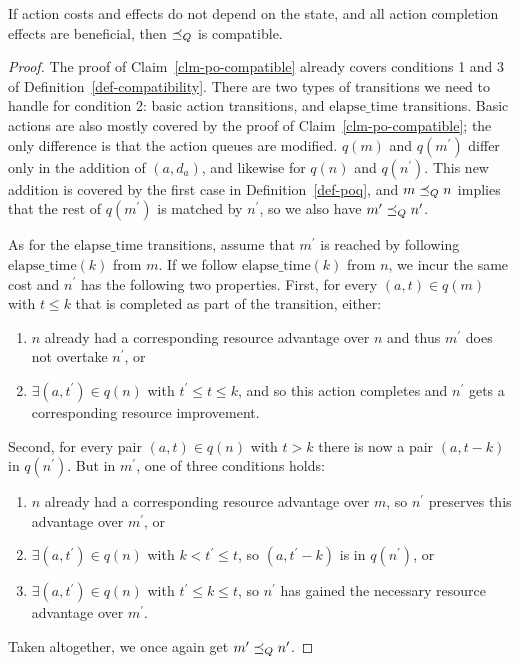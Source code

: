 \documentclass[letterpaper]{article}
\theoremstyle{plain} \newtheorem{theorem}{Theorem} \newtheorem{proposition}{Proposition} \newtheorem{lemma}{Lemma}
\theoremstyle{definition} \newtheorem{definition}{Definition} \newtheorem{conjecture}{Conjecture} \newtheorem*{example}{Example}
\theoremstyle{remark} \newtheorem*{remark}{Remark} \newtheorem*{note}{Note} \newtheorem{case}{Case}
\begin{document}
\begin{claim}{}{\label{clm-poq-compatible}}
	If action costs and effects do not depend on the state, and all action completion effects are beneficial, then $\preceq_Q$ is compatible.
\end{claim}
\begin{proof}

	The proof of Claim~\ref{clm-po-compatible} already covers conditions 1 and 3 of
Definition~\ref{def-compatibility}. There are two types of transitions we need to handle
for condition 2: basic action transitions, and $\mathrm{elapse\_time}$ transitions. Basic
actions are also mostly covered by the proof of Claim~\ref{clm-po-compatible}; the only
difference is that the action queues are modified. $q(m)$ and $q(m^\prime)$ differ only in
the addition of $(a, d_a)$, and likewise for $q(n)$ and $q(n^\prime)$. This new addition is
covered by the first case in Definition~\ref{def-poq}, and $m \preceq_Q n$ implies that the rest
of $q(m^\prime)$ is matched by $n^\prime$, so we also have $m^\prime \preceq_Q n^\prime$.

	As for the $\mathrm{elapse\_time}$ transitions, assume that $m^\prime$ is
reached by following $\mathrm{elapse\_time}(k)$ from $m$. If we follow $\mathrm{elapse\_time}(k)$ from $n$, we incur the same cost and $n^\prime$ has the following two properties. First, for every $(a, t) \in q(m)$ with $t \le k$ that is completed as part of the transition, either:
\begin{enumerate}
	\item $n$ already had a corresponding resource advantage over $n$ and thus $m^\prime$ does not overtake $n^\prime$, or
	\item $\exists (a, t^\prime) \in q(n)$ with $t^\prime \le t \le k$, and so this action completes and $n^\prime$ gets a corresponding resource improvement.
\end{enumerate}
Second, for every pair $(a, t) \in q(n)$ with $t > k$ there is now a pair $(a, t-k)$ in $q(n^\prime)$. But in $m^\prime$, one of three conditions holds:
\begin{enumerate}
	\item $n$ already had a corresponding resource advantage over $m$, so $n^\prime$ preserves this advantage over $m^\prime$, or
	\item $\exists (a, t^\prime) \in q(n)$ with $k < t^\prime \le t$, so $(a, t^\prime-k)$ is in $q(n^\prime)$, or
	\item $\exists (a, t^\prime) \in q(n)$ with $t^\prime \le k \le t$, so $n^\prime$ has gained the necessary resource advantage over $m^\prime$.
\end{enumerate}
Taken altogether, we once again get $m^\prime \preceq_Q n^\prime$.

\end{proof}
\end{document}
